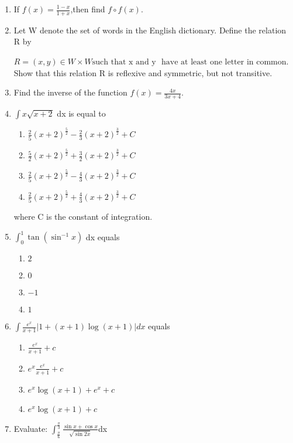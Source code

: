 \begin{enumerate}
\item If $f(x)=\frac{1-x}{1+x}$,then find $f\circ f(x)$.
\item Let W denote the set of words in the English dictionary. Define the relation R by

$R = (x, y) \in W \times W \text{such that} \text{ x  and y }  \text{ have at least one letter in common}$.
Show that this relation R is reflexive and symmetric, but not transitive.

\item Find the inverse of the function $f(x) = \frac{4x}{3x+4}$.

\item $\int x \sqrt{x + 2}$ dx is equal to
\begin{enumerate}
\item $\frac{2}{5}(x + 2)^{\frac{5}{2}} - \frac{2}{3}(x + 2)^{\frac{3}{2}} + C$
\item $\frac{5}{2}(x + 2)^{\frac{5}{2}} + \frac{3}{2}(x + 2)^{\frac{3}{2}} + C$
\item $\frac{2}{5}(x + 2)^{\frac{5}{2}} - \frac{4}{3}(x + 2)^{\frac{3}{2}} + C$
\item $\frac{2}{5}(x + 2)^{\frac{5}{2}} + \frac{4}{3}(x + 2)^{\frac{3}{2}} + C$
\end{enumerate}

where C is the constant of integration.

\item  $\int_{0}^{1} \tan(\sin^{-1}x)$ dx equals
\begin{enumerate}

\item $2$ 
\item  $0$
\item  $-1$
\item  $1$
\end{enumerate}

\item $\int {\frac{e^x}{x+1}}|1+(x+1)\log(x+1)| dx $ equals
\begin{enumerate}
\item  $\frac{e^x}{x+1}+c$
\item  $e^x\frac{e^x}{x+1}+c$
\item  $e^x\log(x+1)+e^x+c$
\item  $e^x\log(x+1)+c$
\end{enumerate}

\item Evaluate:
$\int_{\frac{\pi}{6}}^{\frac{\pi}{3}}  {\frac{\sin x + \cos x}{\sqrt{\sin 2x}}} $dx  


\end{enumerate}
